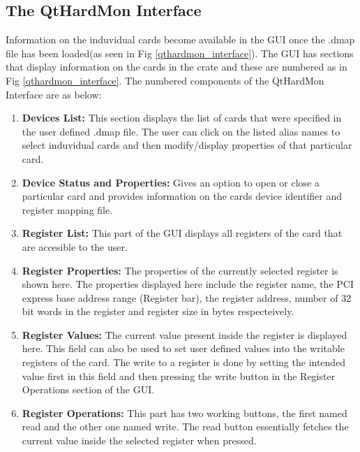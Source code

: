 \subsection{The QtHardMon Interface}
Information on the induvidual cards become available in the GUI once the .dmap file has been loaded(as seen in Fig \ref{qthardmon_interface}). The GUI has sections that display information on the cards in the crate and these are numbered as in Fig \ref{qthardmon_interface}. The numbered components of the QtHardMon Interface are as below:
\begin{enumerate}
\item \textbf{Devices List:} This section displays the list of cards that were specified in the user defined .dmap file. The user can click on the listed alias names to select induvidual cards and then modify/display properties of that particular card. 
\item \textbf{Device Status and Properties:} Gives an option to open or close a particular card and provides information on the cards device identifier and register mapping file.
\item \textbf{Register List:} This part of the GUI displays all registers of the card that are accesible to the user.
\item \textbf{Register Properties:} The properties of the currently selected register is shown here. The properties displayed here include the register name, the PCI express base address range (Register bar), the register address, number of 32 bit words in the register and register size in bytes respecteively.
\item \textbf{Register Values:} The current value present inside the register is displayed here. This field can also be used to set user defined values into the writable registers of the card. The write to a register is done by setting the intended value first in this field and then pressing the write button in the Register Operations section  of the GUI.
\item \textbf{Register Operations:} This part has two working buttons, the first named read and the other one named write. The read button essentially fetches the current value inside the selected register when pressed.


\end{enumerate}
